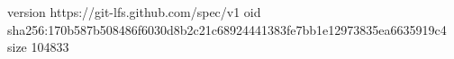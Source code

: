 version https://git-lfs.github.com/spec/v1
oid sha256:170b587b508486f6030d8b2c21c68924441383fe7bb1e12973835ea6635919c4
size 104833
